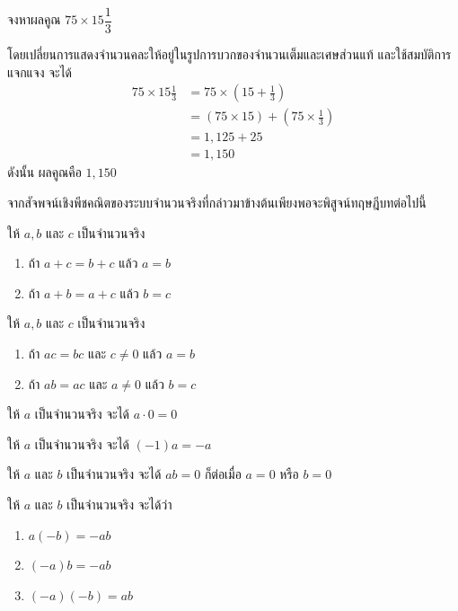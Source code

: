 \begin{examplebox}
จงหาผลคูณ $75 \times 15 \dfrac{1}{3}$
\end{examplebox}
\solution โดยเปลี่ยนการแสดงจำนวนคละให้อยู่ในรูปการบวกของจำนวนเต็มและเศษส่วนแท้ และใช้สมบัติการแจกแจง จะได้
\begin{align*}
	75 \times 15 \frac{1}{3} &= 75 \times \left(15 + \frac{1}{3}\right) \\
	&= (75 \times 15) + \left(75 \times \frac{1}{3}\right) \\
	&= 1,125 + 25 \\
	&= 1,150
\end{align*}
ดังนั้น ผลคูณคือ $1,150$


จากสัจพจน์เชิงพีชคณิตของระบบจำนวนจริงที่กล่าวมาข้างต้นเพียงพอจะพิสูจน์ทฤษฎีบทต่อไปนี้

\begin{theorembox}
ให้ $a, b$ และ $c$ เป็นจำนวนจริง
\begin{enumerate}
	\item ถ้า $a+c=b+c$ แล้ว $a=b$
	\item ถ้า $a+b=a+c$ แล้ว $b=c$
\end{enumerate}
\end{theorembox}


\begin{theorembox}
	ให้ $a, b$ และ $c$ เป็นจำนวนจริง
	\begin{enumerate}
		\item ถ้า $a c=b c$ และ $c \neq 0$ แล้ว $a=b$
		\item ถ้า $a b=a c$ และ $a \neq 0$ แล้ว $b=c$
	\end{enumerate}
\end{theorembox}

\begin{theorembox}
ให้ $a$ เป็นจำนวนจริง จะได้ $a \cdot 0=0$
\end{theorembox}

\begin{theorembox}
ให้ $a$ เป็นจำนวนจริง จะได้ $(-1) a=-a$
\end{theorembox}


\begin{theorembox}
ให้ $a$ และ $b$ เป็นจำนวนจริง จะได้ $a b=0$ ก็ต่อเมื่อ $a=0$ หรือ $b=0$
\end{theorembox}

\begin{theorembox}
ให้ $a$ และ $b$ เป็นจำนวนจริง จะได้ว่า
	\begin{enumerate}
	\item $a(-b)=-a b$
	\item $(-a) b=-a b$
	\item $(-a)(-b)=a b$
\end{enumerate}
\end{theorembox}

